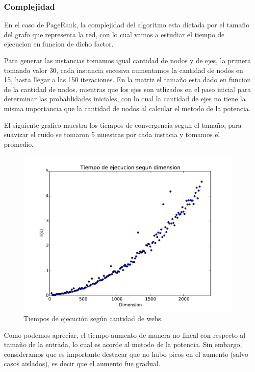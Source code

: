 \subsubsection{Complejidad}

En el caso de PageRank, la complejidad del algoritmo esta dictada por el tamaño del grafo que representa la red, con lo cual vamos a estudiar el tiempo de ejecucion en funcion de dicho factor.

Para generar las instancias tomamos igual cantidad de nodos y de ejes, la primera tomando valor 30, cada instancia sucesiva aumentamos la cantidad de nodos en 15, hasta llegar a las 150 iteraciones. En la matriz el tamaño esta dado en funcion de la cantidad de nodos, mientras que los ejes son utlizados en el paso inicial para determinar las probablidades iniciales, con lo cual la cantidad de ejes no tiene la misma importancia que la cantidad de nodos al calcular el metodo de la potencia.

El siguiente grafico muestra los tiempos de convergencia segun el tamaño, para suavizar el ruido se tomaron 5 muestras por cada instacia y tomamos el promedio.

\begin{figure}[H]
\centering
\includegraphics[scale=0.7]{images/complejidad.pdf}
\caption{Tiempos de ejecución según cantidad de webs.}
\label{timePageRank}
\end{figure}

Como podemos apreciar, el tiempo aumento de manera no lineal con respecto al tamaño de la entrada, lo cual es acorde al metodo de la potencia. Sin embargo, consideramos que es importante destacar que no hubo picos en el aumento (salvo casos aislados), es decir que el aumento fue gradual.